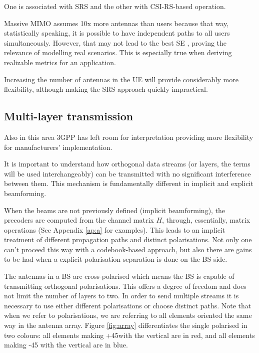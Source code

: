 
One is associated with SRS and the other with CSI-RS-based operation.





Massive MIMO assumes 10x more antennas than users because that way, statistically speaking, it is possible to have independent paths to all users simultaneously. However, that may not lead to the best \ac{SE} \cite{7294693}, proving the relevance of modelling real scenarios. This is especially true when deriving realizable metrics for an application. 

Increasing the number of antennas in the UE will provide considerably more flexibility, although making the SRS approach quickly impractical.






\subsection*{Multi-layer transmission}

Also in this area 3GPP has left room for interpretation providing more flexibility for manufacturers' implementation.

It is important to understand how orthogonal data streams (or layers, the terms will be used interchangeably) can be transmitted with no significant interference between them. This mechanism is fundamentally different in implicit and explicit beamforming.

When the beams are not previously defined (implicit beamforming), the precoders are computed from the channel matrix $H$, through, essentially, matrix operations (See Appendix \ref{ap:a} for examples). This leads to an implicit treatment of different propagation paths and distinct polarisations. Not only one can't proceed this way with a codebook-based approach, but also there are gains to be had when a explicit polarisation separation is done on the BS side.

The antennas in a BS are cross-polarised \cite{3gpp-antennas} which means the BS is capable of transmitting orthogonal polarisations. This offers a degree of freedom and does not limit the number of layers to two. In order to send multiple streams it is necessary to use either different polarisations or choose distinct paths. Note that when we refer to polarisations, we are referring to all elements oriented the same way in the antenna array. Figure \ref{fig:array} differentiates the single polarised in two colours: all elements making +45\textdegree with the vertical are in red, and all elements making -45 \textdegree with the vertical are in blue.


